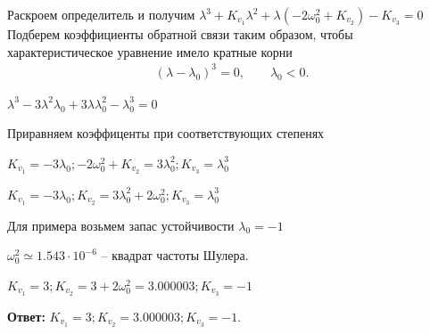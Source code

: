 \documentclass[a4paper,14pt]{article}
\theoremstyle{plain} %
\theoremstyle{definition} %
\theoremstyle{remark} %
\begin{document}
Раскроем определитель и получим
$\lambda^3+K_{v_1}\lambda^2+\lambda(-2\omega_0^2 + K_{v_2})-K_{v_3}=0$
Подберем коэффициенты обратной связи таким образом, чтобы характеристическое уравнение имело кратные корни
\begin{eqnarray*}
    \left(\lambda - \lambda_0\right)^3 = 0, \qquad \lambda_0 < 0.
\end{eqnarray*}

$\lambda^3-3\lambda^2\lambda_0+3\lambda\lambda_0^2-\lambda_0^3=0$

Приравняем коэффиценты при соответствующих степенях

$K_{v_1}=-3\lambda_0; -2\omega_0^2 + K_{v_2}=3\lambda_0^2; K_{v_3}=\lambda_0^3$

$K_{v_1}=-3\lambda_0; K_{v_2}=3\lambda_0^2+2\omega_0^2; K_{v_3}=\lambda_0^3$

Для примера возьмем запас устойчивости $\lambda_0=-1$

$\omega_0^2 \simeq 1.543\cdot 10^{-6}$ -- квадрат частоты Шулера.

$K_{v_1}=3; K_{v_2}=3+2\omega_0^2=3.000003; K_{v_3}=-1$

\textbf{Ответ:} $K_{v_1}=3; K_{v_2}=3.000003; K_{v_3}=-1.$
\end{document}
